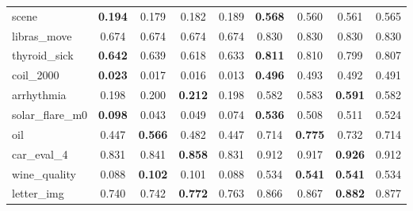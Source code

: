 \begin{figure}[ht]
\begin{tabular}{p{22mm}|*4{p{14mm}}|*4{p{14mm}}}
        scene&\multicolumn{1}{c}{\textbf{0.194}}&\multicolumn{1}{c}{0.179}&\multicolumn{1}{c}{0.182}&\multicolumn{1}{c|}{0.189}&\multicolumn{1}{c}{\textbf{0.568}}&\multicolumn{1}{c}{0.560}&\multicolumn{1}{c}{0.561}&\multicolumn{1}{c}{0.565}\\
        libras\_move&\multicolumn{1}{c}{0.674}&\multicolumn{1}{c}{0.674}&\multicolumn{1}{c}{0.674}&\multicolumn{1}{c|}{0.674}&\multicolumn{1}{c}{0.830}&\multicolumn{1}{c}{0.830}&\multicolumn{1}{c}{0.830}&\multicolumn{1}{c}{0.830}\\
        thyroid\_sick&\multicolumn{1}{c}{\textbf{0.642}}&\multicolumn{1}{c}{0.639}&\multicolumn{1}{c}{0.618}&\multicolumn{1}{c|}{0.633}&\multicolumn{1}{c}{\textbf{0.811}}&\multicolumn{1}{c}{0.810}&\multicolumn{1}{c}{0.799}&\multicolumn{1}{c}{0.807}\\
        coil\_2000&\multicolumn{1}{c}{\textbf{0.023}}&\multicolumn{1}{c}{0.017}&\multicolumn{1}{c}{0.016}&\multicolumn{1}{c|}{0.013}&\multicolumn{1}{c}{\textbf{0.496}}&\multicolumn{1}{c}{0.493}&\multicolumn{1}{c}{0.492}&\multicolumn{1}{c}{0.491}\\
        arrhythmia&\multicolumn{1}{c}{0.198}&\multicolumn{1}{c}{0.200}&\multicolumn{1}{c}{\textbf{0.212}}&\multicolumn{1}{c|}{0.198}&\multicolumn{1}{c}{0.582}&\multicolumn{1}{c}{0.583}&\multicolumn{1}{c}{\textbf{0.591}}&\multicolumn{1}{c}{0.582}\\
        solar\_flare\_m0&\multicolumn{1}{c}{\textbf{0.098}}&\multicolumn{1}{c}{0.043}&\multicolumn{1}{c}{0.049}&\multicolumn{1}{c|}{0.074}&\multicolumn{1}{c}{\textbf{0.536}}&\multicolumn{1}{c}{0.508}&\multicolumn{1}{c}{0.511}&\multicolumn{1}{c}{0.524}\\
        oil&\multicolumn{1}{c}{0.447}&\multicolumn{1}{c}{\textbf{0.566}}&\multicolumn{1}{c}{0.482}&\multicolumn{1}{c|}{0.447}&\multicolumn{1}{c}{0.714}&\multicolumn{1}{c}{\textbf{0.775}}&\multicolumn{1}{c}{0.732}&\multicolumn{1}{c}{0.714}\\
        car\_eval\_4&\multicolumn{1}{c}{0.831}&\multicolumn{1}{c}{0.841}&\multicolumn{1}{c}{\textbf{0.858}}&\multicolumn{1}{c|}{0.831}&\multicolumn{1}{c}{0.912}&\multicolumn{1}{c}{0.917}&\multicolumn{1}{c}{\textbf{0.926}}&\multicolumn{1}{c}{0.912}\\
        wine\_quality&\multicolumn{1}{c}{0.088}&\multicolumn{1}{c}{\textbf{0.102}}&\multicolumn{1}{c}{0.101}&\multicolumn{1}{c|}{0.088}&\multicolumn{1}{c}{0.534}&\multicolumn{1}{c}{\textbf{0.541}}&\multicolumn{1}{c}{\textbf{0.541}}&\multicolumn{1}{c}{0.534}\\
        letter\_img&\multicolumn{1}{c}{0.740}&\multicolumn{1}{c}{0.742}&\multicolumn{1}{c}{\textbf{0.772}}&\multicolumn{1}{c|}{0.763}&\multicolumn{1}{c}{0.866}&\multicolumn{1}{c}{0.867}&\multicolumn{1}{c}{\textbf{0.882}}&\multicolumn{1}{c}{0.877}\\

\end{tabular}
\end{figure}
